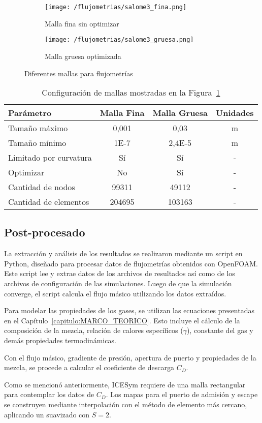 \begin{figure}[h!]
  \centering
  \begin{subfigure}[t]{0.5\textwidth}
    \centering
    \texttt{[image: /flujometrias/salome3\_fina.png]}
    \caption{Malla fina sin optimizar}
  \end{subfigure}%
  \begin{subfigure}[t]{0.5\textwidth}
    \centering
    \texttt{[image: /flujometrias/salome3\_gruesa.png]}
    \caption{Malla gruesa optimizada}
  \end{subfigure}
\caption{Diferentes mallas para flujometrías}\label{fig:salome_fina_gruesa}
\end{figure}

\begin{table}[h!]
  \centering
  \begin{tabular}{lccc} \toprule
    Parámetro                & Malla Fina    & Malla Gruesa     & Unidades\\ \midrule
    Tamaño máximo            & 0,001 & 0,03             & m \\
    Tamaño mínimo            & 1E-7          & 2,4E-5 & m \\
    Limitado por curvatura   & Sí            & Sí               & - \\
    Optimizar                & No            & Sí               & - \\
    Cantidad de nodos        & 99311         & 49112            & - \\
    Cantidad de elementos & 204695        & 103163           & - \\ \bottomrule
  \end{tabular}
  \caption{Configuración de mallas mostradas en la Figura~\ref{fig:salome_fina_gruesa}}
    \label{tab:salome_fina_gruesa}
\end{table}

\subsection{Post-procesado}

La extracción y análisis de los resultados se realizaron mediante un script en
Python, diseñado para procesar datos de flujometrías obtenidos con OpenFOAM.
%
Este script lee y extrae datos de los archivos de resultados así como de los
archivos de configuración de las simulaciones.
%
Luego de que la simulación converge, el script calcula el flujo
másico utilizando los datos extraídos.

Para modelar las propiedades de los gases, se utilizan las ecuaciones
presentadas en el Capítulo~\ref{capitulo:MARCO_TEORICO}.
%
Esto incluye el cálculo de la composición de la mezcla, relación de calores
específicos ($\gamma$), constante del gas y demás propiedades termodinámicas.

Con el flujo másico, gradiente de presión, apertura de puerto y propiedades de
la mezcla, se procede a calcular el coeficiente de descarga $C_{D}$.

Como se mencionó anteriormente, ICESym requiere de una malla rectangular para
contemplar los datos de $C_{D}$.
%
Los mapas para el puerto de admisión y escape se construyen mediante
interpolación con el método de elemento más cercano, aplicando un suavizado con
$S=2$.
